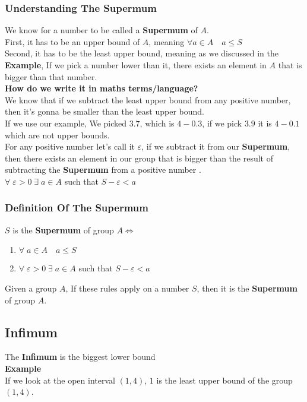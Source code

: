 \subsubsection{Understanding The Supermum}
We know for a number to be called a \textbf{Supermum} of $A$.\\
First, it has to be an upper bound of $A$, meaning $\forall a\in A\quad a\leq S$\\
Second, it has to be the least upper bound, meaning as we discussed in the \textbf{Example}, If we pick a number lower than it, there exists an element in $A$ that is bigger than that number.\\
\textbf{How do we write it in maths terms/language?}\\
We know that if we subtract the least upper bound from any positive number, then it's gonna be smaller than the least upper bound.\\
If we use our example, We picked $3.7$, which is $4-0.3$, if we pick $3.9$ it is $4-0.1$ which are not upper bounds.\\
For any positive number let's call it $\varepsilon$, if we subtract it from our \textbf{Supermum}, then there exists an element in our group that is bigger than the result of subtracting the \textbf{Supermum} from a positive number .\\
$\forall\; \varepsilon > 0 \; \exists \; a\in A$ such that \; $S-\varepsilon < a$\\

\subsubsection{Definition Of The Supermum}
$S$ is the \textbf{Supermum} of group $A \iff$\\
\begin{enumerate}
    \item $\forall\; a\in A \quad a\leq S$
    \item $\forall\; \varepsilon > 0 \; \exists\; a\in A$ such that $S-\varepsilon<a$
\end{enumerate}
Given a group $A$, If these rules apply on a number $S$, then it is the \textbf{Supermum} of group $A$.\\

\subsection{Infimum}
The \textbf{Infimum} is the biggest lower bound\\
\textbf{Example}\\
If we look at the open interval $(1,4)$, $1$ is the least upper bound of the group $(1,4)$.\\
